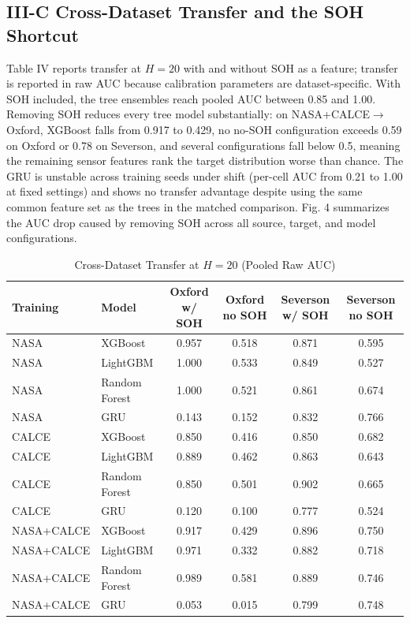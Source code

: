 \documentclass[conference]{IEEEtran}
\begin{document}
\subsection{III-C Cross-Dataset Transfer and the SOH Shortcut}
Table IV reports transfer at $H{=}20$ with and without
SOH as a feature; transfer is reported in raw AUC because calibration
parameters are dataset-specific. With SOH included, the tree ensembles
reach pooled AUC between 0.85 and 1.00. Removing SOH reduces every
tree model substantially: on NASA+CALCE$\to$Oxford, XGBoost falls from
0.917 to 0.429, no no-SOH configuration exceeds 0.59 on Oxford or 0.78
on Severson, and several configurations fall below 0.5, meaning the
remaining sensor features rank the target distribution worse than
chance. The GRU is unstable across training seeds under shift
(per-cell AUC from 0.21 to 1.00 at fixed settings) and shows no
transfer advantage despite using the same common feature set as the
trees in the matched comparison. Fig. 4 summarizes
the AUC drop caused by removing SOH across all source, target, and
model configurations.

\begin{table}[!t]
\caption{Cross-Dataset Transfer at $H{=}20$ (Pooled Raw AUC)}
\label{tab:transfer}
\centering
\begin{tabular}{|l|l|c|c|c|c|}
\hline
\textbf{Training} & \textbf{Model} & \textbf{Oxford w/ SOH} & \textbf{Oxford no SOH} & \textbf{Severson w/ SOH} & \textbf{Severson no SOH}\\
\hline
NASA & XGBoost & 0.957 & 0.518 & 0.871 & 0.595 \\ \hline
NASA & LightGBM & 1.000 & 0.533 & 0.849 & 0.527 \\ \hline
NASA & Random Forest & 1.000 & 0.521 & 0.861 & 0.674 \\ \hline
NASA & GRU & 0.143 & 0.152 & 0.832 & 0.766 \\ \hline
CALCE & XGBoost & 0.850 & 0.416 & 0.850 & 0.682 \\ \hline
CALCE & LightGBM & 0.889 & 0.462 & 0.863 & 0.643 \\ \hline
CALCE & Random Forest & 0.850 & 0.501 & 0.902 & 0.665 \\ \hline
CALCE & GRU & 0.120 & 0.100 & 0.777 & 0.524 \\ \hline
NASA+CALCE & XGBoost & 0.917 & 0.429 & 0.896 & 0.750 \\ \hline
NASA+CALCE & LightGBM & 0.971 & 0.332 & 0.882 & 0.718 \\ \hline
NASA+CALCE & Random Forest & 0.989 & 0.581 & 0.889 & 0.746 \\ \hline
NASA+CALCE & GRU & 0.053 & 0.015 & 0.799 & 0.748 \\ \hline
\end{tabular}
\end{table}
\end{document}
